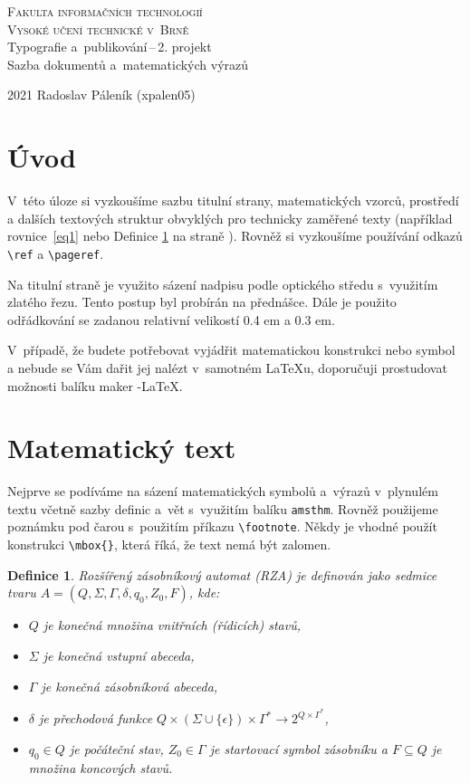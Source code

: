 \documentclass[a4paper, 11pt,twocolumn]{article}
\newtheorem{definition}{Definice}
\begin{document}
\begin{titlepage}
\begin{center}
    {\Huge
    \textsc{Fakulta informačních technologií\\ Vysoké učení technické v~Brně}\\
    }
    \LARGE{Typografie a~publikování\,--\,2. projekt\\
    Sazba dokumentů a~matematických výrazů\\}
\end{center}
{\Large 2021 \hfill
Radoslav Páleník (xpalen05)}
\end{titlepage}

\section*{Úvod}
V~této úloze si vyzkoušíme sazbu titulní strany, matematických vzorců, prostředí a dalších textových struktur obvyklých pro technicky zaměřené texty (například rovnice~\eqref{eq1}
nebo Definice \ref{def1} na straně \pageref{def1}). Rovněž si vyzkoušíme používání odkazů \verb|\ref| a \verb|\pageref|.

Na titulní straně je využito sázení nadpisu podle optického středu s~využitím zlatého řezu. Tento postup byl
probírán na přednášce. Dále je použito odřádkování se
zadanou relativní velikostí 0.4 em a 0.3 em.

V~případě, že budete potřebovat vyjádřit matematickou
konstrukci nebo symbol a nebude se Vám dařit jej nalézt
v~samotném \LaTeX u, doporučuji prostudovat možnosti balíku maker \AmS-\LaTeX.
\section{Matematický text}

Nejprve se podíváme na sázení matematických symbolů
a~výrazů v~plynulém textu včetně sazby definic a~vět s~využitím balíku \verb|amsthm|. Rovněž použijeme poznámku pod
čarou s~použitím příkazu \verb|\footnote|. Někdy je vhodné
použít konstrukci \verb|\mbox{}|, která říká, že text nemá být
zalomen.

\begin{definition}
\label{def1}
\emph{Rozšířený zásobníkový automat} (RZA) je definován jako sedmice tvaru $A = (Q, \Sigma, \Gamma, \delta, q_0, Z_0, F)$, kde:
\begin{itemize}
 \item $Q$ je konečná množina \emph{vnitřních (řídicích) stavů},
 \item $\Sigma$ je konečná \emph{vstupní abeceda},
 \item $\Gamma$ je konečná \emph{zásobníková abeceda},
 \item$\delta$ je \emph{přechodová funkce} $Q\times(\Sigma\cup\{\epsilon\})\times\Gamma^\ast\rightarrow2^{Q\times\Gamma^\ast}$, 
 \item $q_0 \in Q $ je \emph{počáteční stav}, $Z_0 \in \Gamma$ je \emph{startovací symbol
zásobníku} a $F \subseteq Q$ je množina \emph{koncových stavů}.
\end{itemize}
\end{definition}
\end{document}
